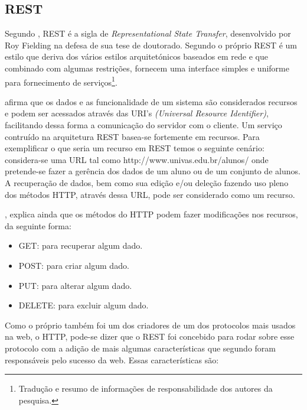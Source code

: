 	\subsection{REST}
	
			\par Segundo , REST é a sigla de
		\textit{Representational State Transfer}, desenvolvido por Roy Fielding na
		defesa de sua tese de doutorado. Segundo o próprio 
		REST é um estilo que deriva dos vários estilos arquitetónicos baseados em rede
		e  que combinado com algumas restrições, fornecem uma interface simples e
		uniforme para fornecimento de serviços\footnote{Tradução e resumo de
		informações de responsabilidade dos autores da pesquisa.}.
			
			\par {} afirma que os dados e as funcionalidade de um
			sistema são considerados recursos e podem ser acessados através das URI's
		\textit{(Universal Resource Identifier)}, facilitando dessa forma a comunicação
		do servidor com o cliente. Um serviço contruído na arquitetura REST
		basea-se fortemente em recursos. Para exemplificar o que seria um recurso em
		REST temos o seguinte cenário: considera-se uma URL tal como 
		http://www.univas.edu.br/alunos/ onde pretende-se fazer a gerência dos dados
		de um aluno ou de um conjunto de alunos. A recuperação de dados, bem como sua
		edição e/ou deleção fazendo uso pleno dos métodos HTTP, através dessa URL,
		pode ser considerado como um recurso.
			\par {}, explica ainda que os métodos do HTTP podem fazer
		modificações nos recursos, da seguinte forma:
			
			 \begin{itemize}
			   \item GET: para recuperar algum dado. 
			   \item POST: para criar algum dado.
			   \item PUT: para alterar algum dado. 
			   \item DELETE: para excluir algum dado. 
			 \end{itemize}
			 	
			\par Como o próprio  também foi um dos criadores de um
		dos protocolos mais usados na web, o HTTP, pode-se dizer que o REST foi
		concebido para rodar sobre esse protocolo com a adição de mais algumas
		características que segundo  foram responsáveis pelo
		sucesso da web. Essas características são:
		
